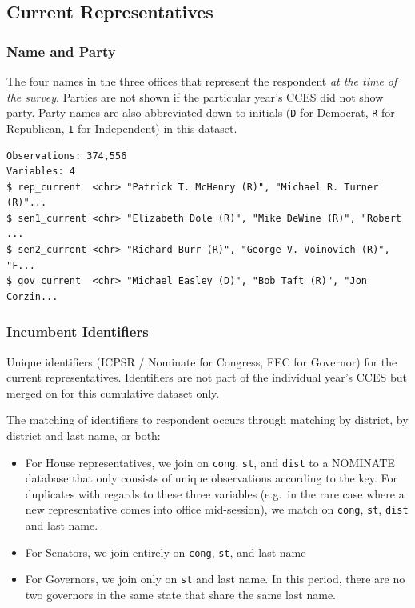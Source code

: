 \documentclass[10pt,article,oneside]{memoir}
\theoremstyle{definition}
\begin{document}
\subsection{Current Representatives}\label{current-representatives}

\subsubsection{Name and Party}\label{name-and-party}

The four names in the three offices that represent the respondent
\emph{at the time of the survey}. Parties are not shown if the
particular year's CCES did not show party. Party names are also
abbreviated down to initials (\texttt{D} for Democrat, \texttt{R} for
Republican, \texttt{I} for Independent) in this dataset.

\begin{verbatim}
Observations: 374,556
Variables: 4
$ rep_current  <chr> "Patrick T. McHenry (R)", "Michael R. Turner (R)"...
$ sen1_current <chr> "Elizabeth Dole (R)", "Mike DeWine (R)", "Robert ...
$ sen2_current <chr> "Richard Burr (R)", "George V. Voinovich (R)", "F...
$ gov_current  <chr> "Michael Easley (D)", "Bob Taft (R)", "Jon Corzin...
\end{verbatim}

\subsubsection{Incumbent Identifiers}\label{incumbent-identifiers}

Unique identifiers (ICPSR / Nominate for Congress, FEC for Governor) for
the current representatives. Identifiers are not part of the individual
year's CCES but merged on for this cumulative dataset only.

The matching of identifiers to respondent occurs through matching by
district, by district and last name, or both:

\begin{itemize}
\tightlist
\item
  For House representatives, we join on \texttt{cong}, \texttt{st}, and
  \texttt{dist} to a NOMINATE database that only consists of unique
  observations according to the key. For duplicates with regards to
  these three variables (e.g.~in the rare case where a new
  representative comes into office mid-session), we match on
  \texttt{cong}, \texttt{st}, \texttt{dist} and last name.
\item
  For Senators, we join entirely on \texttt{cong}, \texttt{st}, and last
  name
\item
  For Governors, we join only on \texttt{st} and last name. In this
  period, there are no two governors in the same state that share the
  same last name.
\end{itemize}
\end{document}
